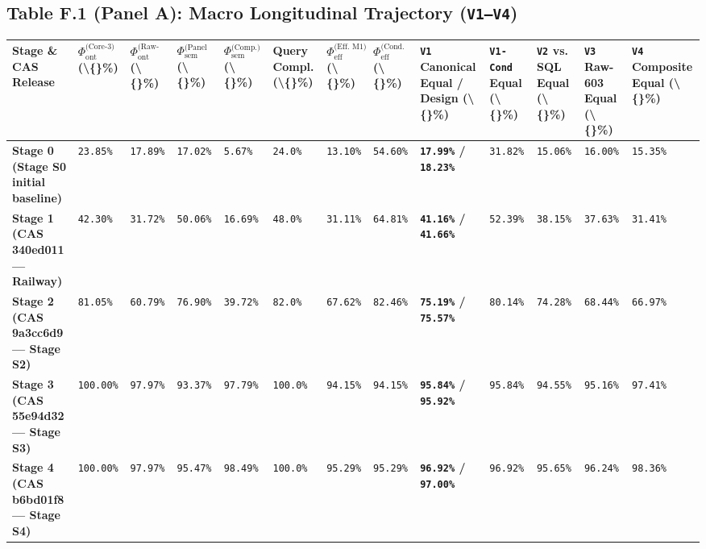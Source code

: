 \documentclass[10pt,a4paper]{article}
\begin{document}
\subsection*{Table F.1 (Panel A): Macro Longitudinal Trajectory (\texttt{V1--V4})}

{\scriptsize
\begin{longtable}{p{}p{}p{}p{}p{}p{}p{}p{}p{}p{}p{}p{}p{}}
\toprule
\textbf{Stage \& CAS Release} & \textbf{$\Phi_{\text{ont}}^{\text{(Core-3)}}$ (\textbackslash\{\}\%)} & \textbf{$\Phi_{\text{ont}}^{\text{(Raw-603)}}$ (\textbackslash\{\}\%)} & \textbf{$\Phi_{\text{sem}}^{\text{(Panel A47)}}$ (\textbackslash\{\}\%)} & \textbf{$\Phi_{\text{sem}}^{\text{(Comp.)}}$ (\textbackslash\{\}\%)} & \textbf{Query Compl. (\textbackslash\{\}\%)} & \textbf{$\Phi_{\text{eff}}^{\text{(Eff. M1)}}$ (\textbackslash\{\}\%)} & \textbf{$\Phi_{\text{eff}}^{\text{(Cond. M1)}}$ (\textbackslash\{\}\%)} & \textbf{\texttt{V1} Canonical Equal / Design (\textbackslash\{\}\%)} & \textbf{\texttt{V1-Cond} Equal (\textbackslash\{\}\%)} & \textbf{\texttt{V2} vs. SQL Equal (\textbackslash\{\}\%)} & \textbf{\texttt{V3} Raw-603 Equal (\textbackslash\{\}\%)} & \textbf{\texttt{V4} Composite Equal (\textbackslash\{\}\%)} \\
\midrule
\endhead
\textbf{Stage 0 (Stage S0 initial baseline)} & \texttt{23.85\%} & \texttt{17.89\%} & \texttt{17.02\%} & \texttt{5.67\%} & \texttt{24.0\%} & \texttt{13.10\%} & \texttt{54.60\%} & \textbf{\texttt{17.99\%} / \texttt{18.23\%}} & \texttt{31.82\%} & \texttt{15.06\%} & \texttt{16.00\%} & \texttt{15.35\%} \\
\textbf{Stage 1 (CAS 340ed011 --- Railway)} & \texttt{42.30\%} & \texttt{31.72\%} & \texttt{50.06\%} & \texttt{16.69\%} & \texttt{48.0\%} & \texttt{31.11\%} & \texttt{64.81\%} & \textbf{\texttt{41.16\%} / \texttt{41.66\%}} & \texttt{52.39\%} & \texttt{38.15\%} & \texttt{37.63\%} & \texttt{31.41\%} \\
\textbf{Stage 2 (CAS 9a3cc6d9 --- Stage S2)} & \texttt{81.05\%} & \texttt{60.79\%} & \texttt{76.90\%} & \texttt{39.72\%} & \texttt{82.0\%} & \texttt{67.62\%} & \texttt{82.46\%} & \textbf{\texttt{75.19\%} / \texttt{75.57\%}} & \texttt{80.14\%} & \texttt{74.28\%} & \texttt{68.44\%} & \texttt{66.97\%} \\
\textbf{Stage 3 (CAS 55e94d32 --- Stage S3)} & \texttt{100.00\%} & \texttt{97.97\%} & \texttt{93.37\%} & \texttt{97.79\%} & \texttt{100.0\%} & \texttt{94.15\%} & \texttt{94.15\%} & \textbf{\texttt{95.84\%} / \texttt{95.92\%}} & \texttt{95.84\%} & \texttt{94.55\%} & \texttt{95.16\%} & \texttt{97.41\%} \\
\textbf{Stage 4 (CAS b6bd01f8 --- Stage S4)} & \texttt{100.00\%} & \texttt{97.97\%} & \texttt{95.47\%} & \texttt{98.49\%} & \texttt{100.0\%} & \texttt{95.29\%} & \texttt{95.29\%} & \textbf{\texttt{96.92\%} / \texttt{97.00\%}} & \texttt{96.92\%} & \texttt{95.65\%} & \texttt{96.24\%} & \texttt{98.36\%} \\
\bottomrule
\end{longtable}
}
\end{document}

